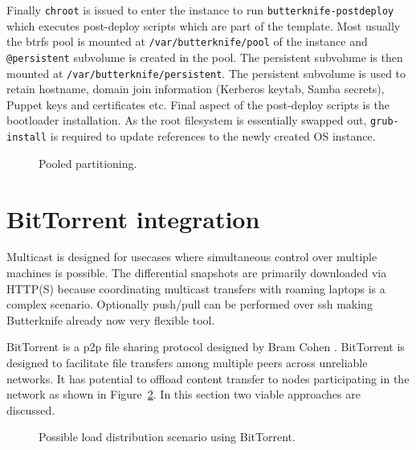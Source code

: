 \documentclass[a4paper,11pt]{kth-mag}
\begin{document}
Finally \lstinline!chroot! is issued to enter the instance to
run \lstinline!butterknife-postdeploy! which executes
post-deploy scripts which are part of the template.
Most usually the \acrshort{btrfs} pool is mounted at \lstinline!/var/butterknife/pool!
of the instance and \lstinline!@persistent! subvolume is created
in the pool.
The persistent subvolume is then mounted at \lstinline!/var/butterknife/persistent!.
The persistent subvolume is used to retain hostname,
domain join information (Kerberos keytab, Samba secrets),
Puppet keys and certificates etc.
Final aspect of the post-deploy scripts is the
bootloader installation.
As the root filesystem is essentially swapped out,
\lstinline!grub-install! is required to update references
to the newly created OS instance.

\begin{figure}[!htb]
\centering
\scalebox{0.4}{}
\caption{Pooled partitioning.}
\label{fig:pooled-partitioning}
\end{figure}


\section{BitTorrent integration}

Multicast is designed for usecases where simultaneous
control over multiple machines is possible.
The differential snapshots are primarily downloaded
via HTTP(S) because coordinating multicast
transfers with roaming laptops is a complex scenario.
Optionally push/pull can be performed over \acrshort{ssh}
making Butterknife already now very flexible tool.

BitTorrent is a \acrfull{p2p} file sharing protocol
designed by Bram Cohen \cite{incentives-build-robustness-in-bittorrent}.
BitTorrent is designed to facilitate file transfers among multiple peers
across unreliable networks.
It has potential to offload content transfer to nodes
participating in the network as shown in
Figure~\ref{fig:butterknife-usecase-bittorrent}.
In this section two viable approaches are discussed.

\begin{figure}[!htb]
\centering
\scalebox{0.5}{}
\caption{Possible load distribution scenario using BitTorrent.}
\label{fig:butterknife-usecase-bittorrent}
\end{figure}
\end{document}

